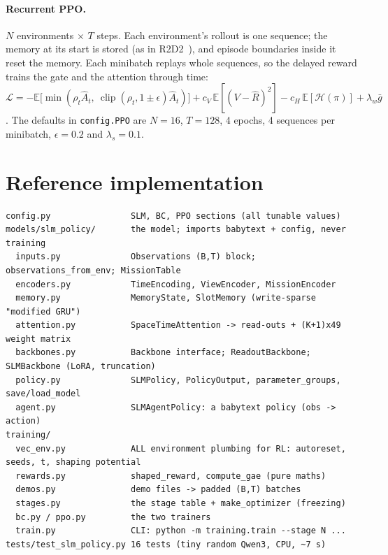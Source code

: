 \documentclass[11pt,a4paper]{article}
\newcommand{\code}[1]{\texttt{\small #1}}
\begin{document}
\paragraph{Recurrent PPO.} $N$ environments $\times$ $T$ steps. Each environment's rollout is one sequence; the memory at
its start is stored (as in R2D2~\cite{kapturowski2019r2d2}), and episode boundaries inside it reset the memory. Each
minibatch replays whole sequences, so the delayed reward trains the gate and the attention through time:
\begin{equation}
\mathcal{L} = -\mathbb{E}\big[\min(\rho_t \hat A_t,\ \operatorname{clip}(\rho_t, 1\pm\epsilon)\hat A_t)\big]
+ c_V\,\mathbb{E}[(V - \hat R)^2] - c_H\,\mathbb{E}[\mathcal{H}(\pi)] + \lambda_w \bar g
\end{equation}
\cite{schulman2017ppo}. The defaults in \code{config.PPO} are $N{=}16$, $T{=}128$, 4 epochs, 4 sequences per minibatch,
$\epsilon{=}0.2$ and $\lambda_s{=}0.1$.

\section{Reference implementation}
\label{sec:code}

\begin{lstlisting}
config.py                SLM, BC, PPO sections (all tunable values)
models/slm_policy/       the model; imports babytext + config, never training
  inputs.py              Observations (B,T) block; observations_from_env; MissionTable
  encoders.py            TimeEncoding, ViewEncoder, MissionEncoder
  memory.py              MemoryState, SlotMemory (write-sparse "modified GRU")
  attention.py           SpaceTimeAttention -> read-outs + (K+1)x49 weight matrix
  backbones.py           Backbone interface; ReadoutBackbone; SLMBackbone (LoRA, truncation)
  policy.py              SLMPolicy, PolicyOutput, parameter_groups, save/load_model
  agent.py               SLMAgentPolicy: a babytext policy (obs -> action)
training/
  vec_env.py             ALL environment plumbing for RL: autoreset, seeds, t, shaping potential
  rewards.py             shaped_reward, compute_gae (pure maths)
  demos.py               demo files -> padded (B,T) batches
  stages.py              the stage table + make_optimizer (freezing)
  bc.py / ppo.py         the two trainers
  train.py               CLI: python -m training.train --stage N ...
tests/test_slm_policy.py 16 tests (tiny random Qwen3, CPU, ~7 s)
\end{lstlisting}
\end{document}
